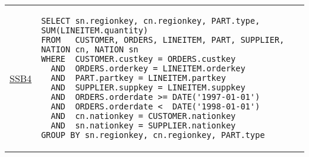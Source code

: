 \hspace{-5mm}\vspace{-8mm}
\begin{tabular}{lp{}}
\begin{rotate}{90}\hspace{-1.1cm}\underline{{\scriptsize SSB4}}\end{rotate} &
{\scriptsize
\begin{verbatim}
SELECT sn.regionkey, cn.regionkey, PART.type, SUM(LINEITEM.quantity)
FROM   CUSTOMER, ORDERS, LINEITEM, PART, SUPPLIER, NATION cn, NATION sn
WHERE  CUSTOMER.custkey = ORDERS.custkey
  AND  ORDERS.orderkey = LINEITEM.orderkey
  AND  PART.partkey = LINEITEM.partkey
  AND  SUPPLIER.suppkey = LINEITEM.suppkey
  AND  ORDERS.orderdate >= DATE('1997-01-01')
  AND  ORDERS.orderdate <  DATE('1998-01-01')
  AND  cn.nationkey = CUSTOMER.nationkey
  AND  sn.nationkey = SUPPLIER.nationkey
GROUP BY sn.regionkey, cn.regionkey, PART.type
\end{verbatim}}
\end{tabular}
